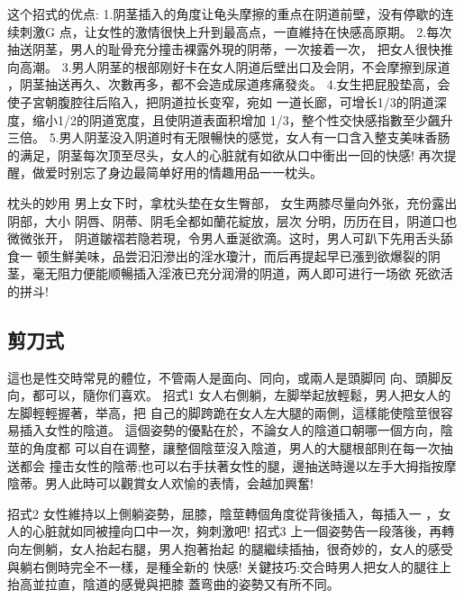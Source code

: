 \documentclass[12pt,UTF8]{ctexbook}
\begin{document}
这个招式的优点:
1.阴茎插入的角度让龟头摩擦的重点在阴道前壁，没有停歇的连续刺激G
点，让女性的激情很快上升到最高点，一直維持在快感高原期。
2.每次抽送阴茎，男人的耻骨充分撞击裸露外現的阴蒂，一次接着一次，
把女人很快推向高潮。
3.男人阴茎的根部刚好卡在女人阴道后壁出口及会阴，不会摩擦到尿道
，阴茎抽送再久、次數再多，都不会造成尿道疼痛發炎。
4.女生把屁股垫高，会使子宮朝腹腔往后陷入，把阴道拉长变窄，宛如
一道长廊，可增长1/3的阴道深度，缩小1/2的阴道宽度，且使阴道表面积增加
1/3，整个性交快感指數至少飆升三倍。
5.男人阴茎没入阴道时有无限暢快的感觉，女人有一口含入整支美味香肠
的满足，阴茎每次顶至尽头，女人的心脏就有如欲从口中衝出一回的快感!
再次提醒，做爱时别忘了身边最简单好用的情趣用品一一枕头。

枕头的妙用
男上女下时，拿枕头垫在女生臀部，
女生两膝尽量向外张，充份露出阴部，大小
阴唇、阴蒂、阴毛全都如蘭花綻放，层次
分明，历历在目，阴道口也微微张开，
阴道皺褶若隐若現，令男人垂涎欲滴。这时，男人可趴下先用舌头舔食一
顿生鮮美味，品尝汩汩滲出的淫水瓊汁，而后再提起早已漲到欲爆裂的阴
茎，毫无阻力便能顺暢插入淫液已充分润滑的阴道，两人即可进行一场欲
死欲活的拼斗!

\subsection{剪刀式}

這也是性交時常見的體位，不管兩人是面向、同向，或兩人是頭脚同
向、頭脚反向，都可以，隨你们喜欢。
招式1
女人右側躺，左脚举起放輕鬆，男人把女人的左脚輕輕握著，举高，把
自己的脚跨跪在女人左大腿的兩側，這樣能使陰莖很容易插入女性的陰道。
這個姿勢的優點在於，不論女人的陰道口朝哪一個方向，陰莖的角度都
可以自在调整，讓整個陰莖沒入陰道，男人的大腿根部則在每一次抽送都会
撞击女性的陰蒂;也可以右手扶著女性的腿，邊抽送時邊以左手大拇指按摩
陰蒂。男人此時可以觀賞女人欢愉的表情，会越加興奮!

招式2
女性維持以上側躺姿勢，屈膝，陰莖轉個角度從背後插入，每插入一
，女人的心脏就如同被撞向口中一次，夠刺激吧!
招式3
上一個姿勢告一段落後，再轉向左側躺，女人抬起右腿，男人抱著抬起
的腿繼续插抽，很奇妙的，女人的感受與躺右側時完全不一樣，是種全新的
快感!
关鍵技巧:交合時男人把女人的腿往上抬高並拉直，陰道的感覺與把膝
蓋弯曲的姿勢又有所不同。
\end{document}
